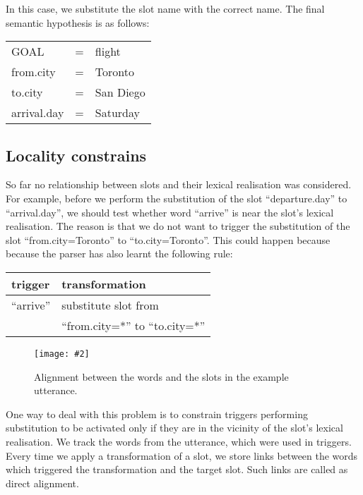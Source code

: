 \documentclass{article}
\newcommand{\fgrparam}[4]{
  \begin{figure}[htbp]
    \begin{center}
      \leavevmode
      \texttt{[image: \#2]}
    \end{center}
    \vspace{-0.5cm}
    \caption{#4}
    \label{#3}
  \end{figure}
}
\begin{document}
In this case, we substitute the slot name with the correct name. The final semantic hypothesis is as follows:

\vspace{.15cm}
\begin{tabular}{lll}
  GOAL          & = & flight \\
  from.city     & = & Toronto \\
  to.city       & = & San Diego \\
  arrival.day    & = & Saturday \\
\end{tabular} 

\subsection{Locality constrains} \label{sec:locality:constrain}
So far no relationship between slots and their lexical realisation was considered. For example, before we perform the substitution of the slot ``departure.day'' to ``arrival.day'', we should test whether word ``arrive'' is near the slot's lexical realisation. The reason is that we do not want to trigger the substitution of the slot ``from.city=Toronto'' to ``to.city=Toronto''. This could happen because because the parser has also learnt the following rule:

\vspace{.15cm}
\begin{tabular}{ll}
  trigger & transformation \\
  \hline 
  ``arrive''            & substitute slot from\\
                        & ``from.city=*'' to ``to.city=*'' \\
\end{tabular} 
\vspace{.15cm}
\fgrparam{width=8cm}{./fig/words-slots-alignment.pdf}{fig:alignment}{Alignment between the words and the slots in the example utterance.}


One way to deal with this problem is to constrain triggers performing substitution to be activated only if they are in the vicinity of the slot's lexical realisation. We track the words from the utterance, which were used in triggers. Every time we apply a transformation of a slot, we store links between the words which triggered the transformation and the target slot. Such links are called as direct alignment. 
\end{document}
